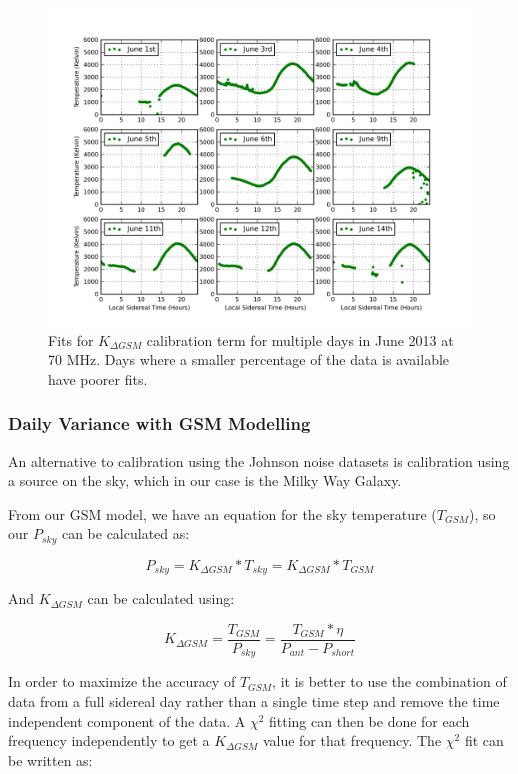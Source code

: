 \begin{figure}[htb]
\begin{center}
\includegraphics[width=0.95\linewidth]{Data_analysis/figures/Combined_Kdgsm_time_series.png}
\caption{Fits for $K_{\Delta GSM}$ calibration term for multiple days in June 2013 at 70 MHz. Days where a smaller percentage of the data is available have poorer fits. }
\label{Fig:Kdgsm_var}
\end{center}
\end{figure}


\subsubsection{Daily Variance with GSM Modelling}

An alternative to calibration using the Johnson noise datasets is calibration using a source on the sky, which in our case is the Milky Way Galaxy. 

From our GSM model, we have an equation for the sky temperature ($T_{GSM}$), so our $P_{sky}$ can be calculated as:

\begin{equation}
P_{sky} = K_{\Delta GSM}*T_{sky} = K_{\Delta GSM} * T_{GSM}
\end{equation}

And $K_{\Delta GSM}$ can be calculated using:

\begin{equation}
K_{\Delta GSM} = \frac{T_{GSM}}{P_{sky}} = \frac{T_{GSM}* \eta}{P_{ant}-P_{short}}
\end{equation}

In order to maximize the accuracy of $T_{GSM}$, it is better to use the combination of data from a full sidereal day rather than a single time step and remove the time independent component of the data. A $\chi^2$ fitting can then be done  for each frequency independently to get a $K_{\Delta GSM}$ value for that frequency. The $\chi^2$ fit can be written as:

